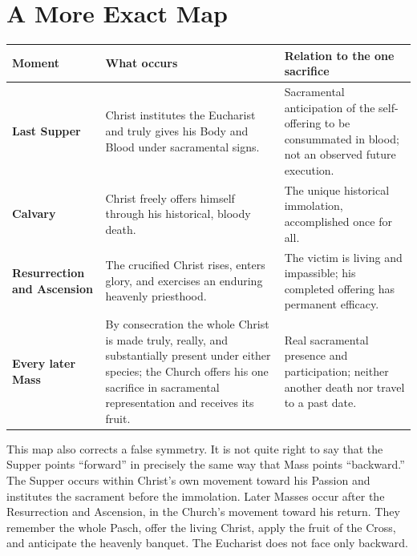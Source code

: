 \section{A More Exact Map}

\begin{center}
\small
\begin{tabularx}{\textwidth}{@{}>{\raggedright\arraybackslash\bfseries}p{}>{\raggedright\arraybackslash}X>{\raggedright\arraybackslash}X@{}}
\toprule
Moment & What occurs & Relation to the one sacrifice \\
\midrule
Last Supper & Christ institutes the Eucharist and truly gives his Body and
Blood under sacramental signs. & Sacramental anticipation of the self-offering
to be consummated in blood; not an observed future execution. \\
Calvary & Christ freely offers himself through his historical, bloody death. &
The unique historical immolation, accomplished once for all. \\
Resurrection and Ascension & The crucified Christ rises, enters glory, and
exercises an enduring heavenly priesthood. & The victim is living and
impassible; his completed offering has permanent efficacy. \\
Every later Mass & By consecration the whole Christ is made truly, really, and
substantially present under either species; the Church offers his one sacrifice
in sacramental representation and receives its fruit. &
Real sacramental presence and participation; neither another death nor travel
to a past date. \\
\bottomrule
\end{tabularx}
\end{center}

This map also corrects a false symmetry. It is not quite right to say that the
Supper points ``forward'' in precisely the same way that Mass points
``backward.'' The Supper occurs within Christ's own movement toward his Passion
and institutes the sacrament before the immolation. Later Masses occur after
the Resurrection and Ascension, in the Church's movement toward his return.
They remember the whole Pasch, offer the living Christ, apply the fruit of the
Cross, and anticipate the heavenly banquet. The Eucharist does not face only
backward.

